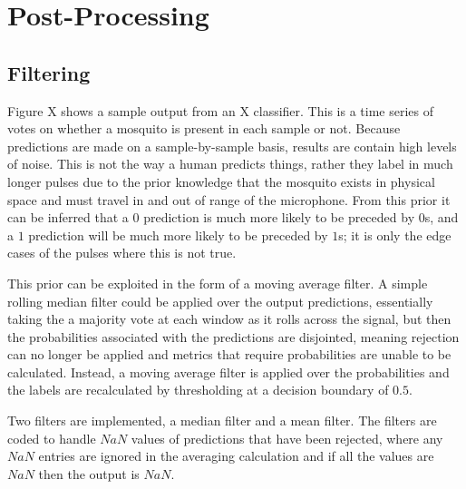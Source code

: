 \section{Post-Processing}
\label{sec:pl-postproc}
    \subsection{Filtering}
    \label{subsec:pl-postproc-filt}
        Figure X shows a sample output from an X classifier. This is a time series of votes on whether a mosquito is present in each sample or not. Because predictions are made on a sample-by-sample basis, results are contain high levels of noise. This is not the way a human predicts things, rather they label in much longer pulses due to the prior knowledge that the mosquito exists in physical space and must travel in and out of range of the microphone. From this prior it can be inferred that a $0$ prediction is much more likely to be preceded by $0$s, and a $1$ prediction will be much more likely to be preceded by $1$s; it is only the edge cases of the pulses where this is not true. 
        
        This prior can be exploited in the form of a moving average filter. A simple rolling median filter could be applied over the output predictions, essentially taking the a majority vote at each window as it rolls across the signal, but then the probabilities associated with the predictions are disjointed, meaning rejection can no longer be applied and metrics that require probabilities are unable to be calculated. Instead, a moving average filter is applied over the probabilities and the labels are recalculated by thresholding at a decision boundary of $0.5$.
        
        Two filters are implemented, a median filter and a mean filter. The filters are coded to handle $NaN$ values of predictions that have been rejected, where any $NaN$ entries are ignored in the averaging calculation and if all the values are $NaN$ then the output is $NaN$.
        
